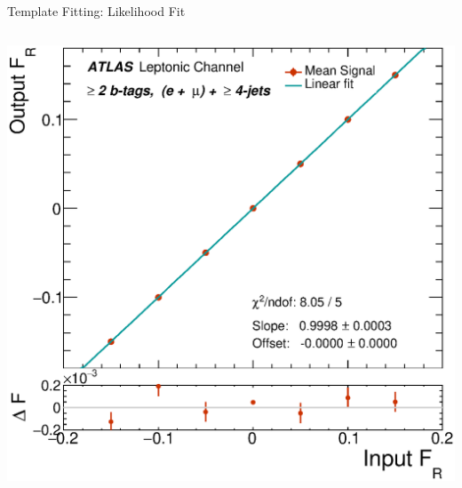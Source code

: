 \documentclass{beamer}
\begin{document}
{\begin{frame}[plain]{Template Fitting: Likelihood Fit}
{\begin{columns}
      \includegraphics[width=1.15\textwidth]{../chapters/whel/figures/cali_curves_June-1-2017/Calicurve_FR_el_mu}
      \end{columns}
    }
  \end{frame}

}
\end{document}
